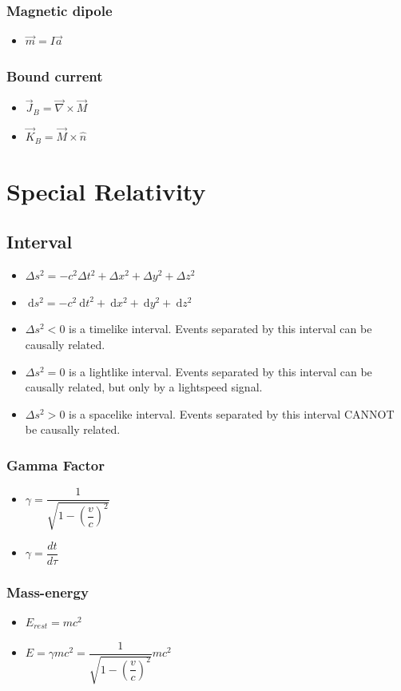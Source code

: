 \documentclass[]{report}
\newcommand \tab[1][1cm]{\hspace*{#1}}
\newcommand{\dn}[1]{\ \mathrm{d}#1}
\newcommand{\curl}{\vec{\nabla}\times}
\newcommand{\itemt}{\item \tab}
\begin{document}
\subsubsection{Magnetic dipole}
\begin{itemize}
\itemt \( \vec{m} = I\vec{a} \)
\end{itemize}

\subsubsection{Bound current}
\begin{itemize}
\itemt \( \vec{J}_B = \curl \vec{M} \)
\itemt \( \vec{K}_B = \vec{M}\times\hat{n} \)
\end{itemize}


	\section{Special Relativity}

\subsection{Interval}
\begin{itemize}
\itemt \( \Delta s^2 = -c^2\Delta t^2 + \Delta x^2 +\Delta y^2 +\Delta z^2 \)
\itemt \( \dn s^2 = -c^2\dn t^2 + \dn x^2 + \dn y^2 + \dn z^2 \)
\itemt \( \Delta s^2 < 0 \) is a timelike interval. Events separated by this interval can be causally related.
\itemt \( \Delta s^2 = 0 \) is a lightlike interval. Events separated by this interval can be causally related, but only by a lightspeed signal.
\itemt \( \Delta s^2 > 0 \) is a spacelike interval. Events separated  by this interval CANNOT be causally related.
\end{itemize}

\subsubsection{Gamma Factor}		
\begin{itemize}
\itemt \( \gamma = \dfrac{1}{\sqrt{1-(\dfrac{v}{c})^2}} \)
\itemt \( \gamma = \dfrac{dt}{d\tau} \)
\end{itemize}		

\subsubsection{Mass-energy}
\begin{itemize}
\itemt \( E_{rest} = mc^2\)
\itemt \( E = \gamma mc^2 = \dfrac{1}{\sqrt{1-(\dfrac{v}{c})^2}}mc^2 \)
\end{itemize}
\end{document}
